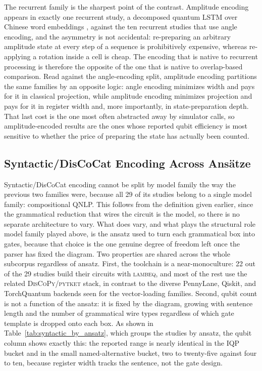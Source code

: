 \documentclass{ieeeaccess}
\begin{document}
The recurrent family is the sharpest point of the contrast. Amplitude encoding appears in exactly one recurrent study, a decomposed quantum LSTM over Chinese word embeddings \cite{hou_realization_2022}, against the ten recurrent studies that use angle encoding, and the asymmetry is not accidental: re-preparing an arbitrary amplitude state at every step of a sequence is prohibitively expensive, whereas re-applying a rotation inside a cell is cheap. The encoding that is native to recurrent processing is therefore the opposite of the one that is native to overlap-based comparison. Read against the angle-encoding split, amplitude encoding partitions the same families by an opposite logic: angle encoding minimizes width and pays for it in classical projection, while amplitude encoding minimizes projection and pays for it in register width and, more importantly, in state-preparation depth. That last cost is the one most often abstracted away by simulator calls, so amplitude-encoded results are the ones whose reported qubit efficiency is most sensitive to whether the price of preparing the state has actually been counted.

\subsection{Syntactic/DisCoCat Encoding Across Ansätze}
\label{subsec:syntactic_across_ansatze}

Syntactic/DisCoCat encoding cannot be split by model family the way the previous two families were, because all 29 of its studies belong to a single model family: compositional QNLP. This follows from the definition given earlier, since the grammatical reduction that wires the circuit is the model, so there is no separate architecture to vary. What does vary, and what plays the structural role model family played above, is the ansatz used to turn each grammatical box into gates, because that choice is the one genuine degree of freedom left once the parser has fixed the diagram. Two properties are shared across the whole subcorpus regardless of ansatz. First, the toolchain is a near-monoculture: 22 out of the 29 studies build their circuits with \textsc{lambeq}, and most of the rest use the related \textsc{DisCoPy}/\textsc{pytket} stack, in contrast to the diverse PennyLane, Qiskit, and TorchQuantum backends seen for the vector-loading families. Second, qubit count is not a function of the ansatz: it is fixed by the diagram, growing with sentence length and the number of grammatical wire types regardless of which gate template is dropped onto each box. As shown in Table~\ref{tab:syntactic_by_ansatz}, which groups the studies by ansatz, the qubit column shows exactly this: the reported range is nearly identical in the IQP bucket and in the small named-alternative bucket, two to twenty-five against four to ten, because register width tracks the sentence, not the gate design.
\end{document}
